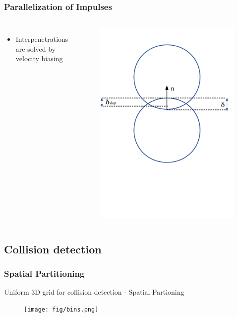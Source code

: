 \documentclass{beamer}
\begin{document}
	\begin{frame}
		\frametitle{Parallelization of Impulses}
		\begin{columns}[c] %
			\begin{itemize}
				\item Interpenetrations are solved by velocity biasing
			\end{itemize}


			\begin{figure}
				\includegraphics[width=0.8\linewidth]{fig/slop.png}
			\end{figure}

		\end{columns}
	\end{frame}


	\subsection{Collision detection}
	\begin{frame}
		\frametitle{Spatial Partitioning}
		Uniform 3D grid for collision detection - Spatial Partioning\\
		\begin{figure}
			\texttt{[image: fig/bins.png]}
		\end{figure}
	\end{frame}
\end{document}
